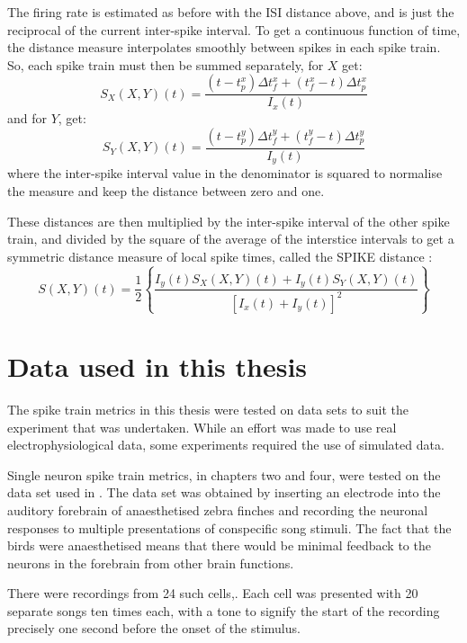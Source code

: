 The firing rate is estimated as before with the ISI distance above, and is just the reciprocal of the current inter-spike interval.  To get a continuous function of time, the distance measure interpolates smoothly between spikes in each spike train. So, each spike train must then be summed separately, for $X$ get:
\begin{equation}
S_X(X,Y)(t) = \frac{(t-t^x_p)\Delta t^x_f + (t^x_f - t)\Delta t^x_p}{I_x(t)}
\end{equation}
and for $Y$, get:
\begin{equation}
S_Y(X,Y)(t) = \frac{(t-t^y_p)\Delta t^y_f + (t^y_f - t)\Delta t^y_p}{I_y(t)}
\end{equation}
where the inter-spike interval value in the denominator is squared to normalise the measure and keep the distance between zero and one.

These distances are then multiplied by the inter-spike interval of the other spike train, and divided by the square of the average of the interstice intervals to get a symmetric distance measure of local spike times, called the SPIKE distance \citep{KreuzEtAl2009a}:
\begin{equation}
S(X,Y)(t) = \frac{1}{2} \left\{\frac{I_y(t)S_X(X,Y)(t) + I_y(t)S_Y(X,Y)(t)}{[I_x(t) + I_y(t)]^2}\right\}
\end{equation}

\section{Data used in this thesis}
The spike train metrics in this thesis were tested on data sets to suit the experiment that was undertaken.  While an effort was made to use real electrophysiological data, some experiments required the use of simulated data.

Single neuron spike train metrics, in chapters two and four, were tested on the data set used in \citep{NarayanEtAl2006b}.  The data set was obtained by inserting an electrode into the auditory forebrain of anaesthetised zebra finches and recording the neuronal responses to multiple presentations of conspecific song stimuli.  The fact that the birds were anaesthetised means that there would be minimal feedback to the neurons in the forebrain from other brain functions.

There were recordings from 24 such cells,. Each cell was presented with 20 separate songs ten times each, with a tone to signify the start of the recording precisely one second before the onset of the stimulus.

